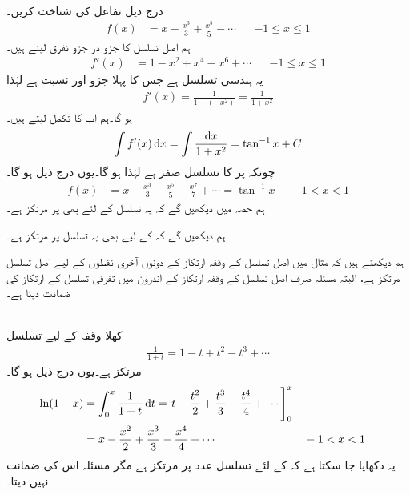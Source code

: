 \\
درج ذیل تفاعل  کی شناخت کریں۔
\begin{align*}
f(x)&=x-\frac{x^3}{3}+\frac{x^5}{5}-\cdots&&-1\le x\le 1
\end{align*}
ہم اصل تسلسل کا جزو در جزو تفرق لیتے ہیں۔
\begin{align*}
f'(x)&=1-x^2+x^4-x^6+\cdots&&-1\le x\le 1
\end{align*}
یہ ہندسی تسلسل ہے جس کا پہلا جزو  اور نسبت  ہے لہٰذا
\begin{align*}
f'(x)=\frac{1}{1-(-x^2)}=\frac{1}{1+x^2}
\end{align*}
ہو گا۔ہم اب  کا تکمل لیتے ہیں۔
\begin{align*}
\int f'(x)\dif x=\int\frac{\dif x}{1+x^2}=\tan^{-1}x+C
\end{align*}
چونکہ  پر  کا تسلسل صفر ہے لہٰذا  ہو گا۔یوں درج ذیل ہو گا۔
\begin{align}
f(x)&=x-\frac{x^3}{3}+\frac{x^5}{5}-\frac{x^7}{7}+\cdots=\tan^{-1}x&&-1<x<1
\end{align}
ہم حصہ  میں دیکھیں گے کہ یہ تسلسل   کے لئے بھی  پر مرتکز ہے۔ 

ہم دیکھیں گے کہ  کے لیے بھی یہ تسلسل  پر مرتکز ہے۔

ہم دیکھتے ہیں کہ مثال  میں اصل تسلسل کے وقفہ ارتکاز کے   دونوں آخری نقطوں کے لیے اصل تسلسل مرتکز ہے، البتہ مسئلہ  صرف اصل تسلسل کے وقفہ ارتکاز کے اندرون میں تفرقی تسلسل کے ارتکاز کی ضمانت دیتا ہے۔

\\
کھلا وقفہ  کے لیے تسلسل
\begin{align*}
\frac{1}{1+t}=1-t+t^2-t^3+\cdots
\end{align*}
 مرتکز ہے۔یوں درج ذیل ہو گا۔
\begin{align*}
\ln(1+x)&=\int_0^x\frac{1}{1+t}\dif t=\left. t-\frac{t^2}{2}+\frac{t^3}{3}-\frac{t^4}{4}+\cdots\right]_0^x\\
&=x-\frac{x^2}{2}+\frac{x^3}{3}-\frac{x^4}{4}+\cdots&&-1<x<1
\end{align*}
یہ دکھایا جا سکتا ہے کہ   کے لئے تسلسل عدد  پر مرتکز ہے  مگر مسئلہ اس کی ضمانت نہیں دیتا۔

